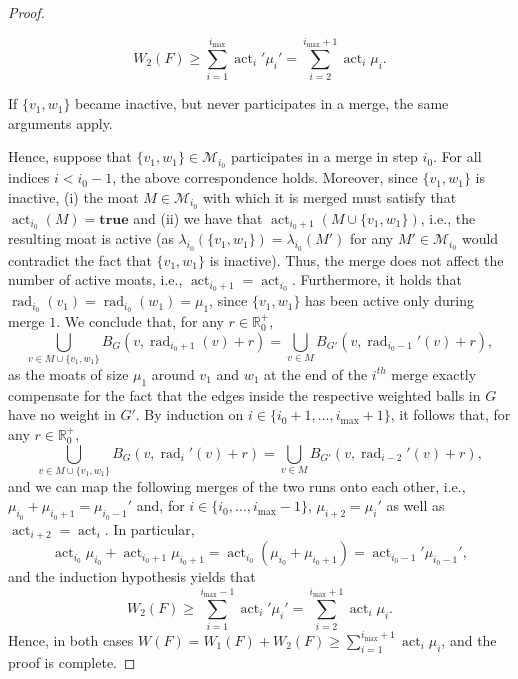 \documentclass[letterpaper,11pt]{article}
\newcommand{\R}{\mathbb{R}}
\newcommand{\M}{\mathcal{M}}
\newcommand{\Comp}{\lambda}
\DeclareMathOperator{\act}{act}
\DeclareMathOperator{\moat}{rad}
\newcommand{\true}{\mathbf{true}}
\begin{document}
\begin{proof}
\begin{compactitem}
\begin{equation*}
  W_2(F)\geq \sum_{i=1}^{i_{\max}}\act_i'\mu_i'=
  \sum_{i=2}^{i_{\max}+1}\act_i\mu_i.
  \end{equation*}
  \item If $\{v_1,w_1\}$ became inactive, but never participates in a merge, the
  same arguments apply.
\end{compactitem}
Hence, suppose that $\{v_1,w_1\}\in \M_{i_0}$ participates in a merge in step
$i_0$. For all indices $i<i_0-1$, the above correspondence holds. Moreover,
since $\{v_1,w_1\}$ is inactive, (i) the moat $M\in \M_{i_0}$ with which it is
merged must satisfy that $\act_{i_0}(M)=\true$ and (ii) we have that
$\act_{i_0+1}(M\cup \{v_1,w_1\})$, i.e., the resulting moat is active (as
$\Comp_{i_0}(\{v_1,w_1\})=\Comp_{i_0}(M')$ for any $M'\in \M_{i_0}$ would
contradict the fact that $\{v_1,w_1\}$ is inactive). Thus, the merge does not
affect the number of active moats, i.e., $\act_{i_0+1}=\act_{i_0}$.
Furthermore, it holds that $\moat_{i_0}(v_1)=\moat_{i_0}(w_1)=\mu_1$, since
$\{v_1,w_1\}$ has been active only during merge $1$. We conclude that, for any
$r\in \R^+_0$,
\begin{equation*}
\bigcup_{v\in M\cup \{v_1,w_1\}}B_G(v,\moat_{i_0+1}(v)+r)
= \bigcup_{v\in M}B_{G'}(v,\moat_{i_0-1}'(v)+r),
\end{equation*}
as the moats of size $\mu_1$ around $v_1$ and $w_1$ at the end of the $i^{th}$
merge exactly compensate for the fact that the edges inside the respective
weighted balls in $G$ have no weight in $G'$. By induction on $i\in
\{i_0+1,\ldots,i_{\max}+1\}$, it follows that, for any $r\in \R^+_0$,
\begin{equation*}
\bigcup_{v\in M\cup \{v_1,w_1\}}B_G(v,\moat_i'(v)+r)
= \bigcup_{v\in M}B_{G'}(v,\moat_{i-2}'(v)+r),
\end{equation*}
and we can map the following merges of the two runs onto each other, i.e.,
$\mu_{i_0}+\mu_{i_0+1}=\mu_{i_0-1}'$ and, for $i\in
\{i_0,\ldots,i_{\max}-1\}$, $\mu_{i+2}=\mu_i'$ as well as
$\act_{i+2}=\act_i$. In particular,
\begin{equation*}
\act_{i_0}\mu_{i_0}+\act_{i_0+1}\mu_{i_0+1}
=\act_{i_0}(\mu_{i_0}+\mu_{i_0+1})=\act_{i_0-1}'\mu_{i_0-1}',
\end{equation*}
and the induction hypothesis yields that
\begin{equation*}
W_2(F)\geq \sum_{i=1}^{i_{\max}-1}\act_i'\mu_i'=
\sum_{i=2}^{i_{\max}+1}\act_i\mu_i.
\end{equation*}
Hence, in both cases $W(F)=W_1(F)+W_2(F)\geq
\sum_{i=1}^{i_{\max}+1}\act_i\mu_i$, and the proof is complete.
\end{proof}
\end{document}
